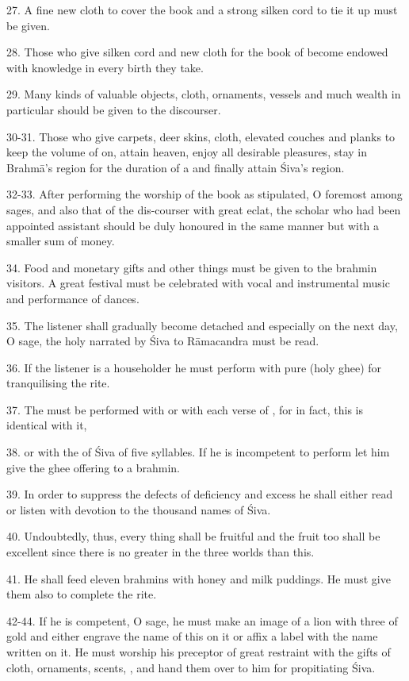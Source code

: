 27. A fine new cloth to cover the book and a strong silken cord to tie it up
must be given.

28. Those who give silken cord and new cloth for the book of  become
 endowed with knowledge in every birth they take.

29. Many kinds of valuable objects, cloth, ornaments, vessels and much wealth in
particular should be given to the discourser.

30-31. Those who give carpets, deer skins, cloth, elevated couches and planks to
keep the volume of  on, attain heaven, enjoy all desirable pleasures,
stay in Brahmā’s region for the duration of a  and finally attain
Śiva’s region.

32-33. After performing the worship of the book as stipulated, O foremost among
sages, and also that of the dis-courser with great eclat, the scholar who had
been appointed assistant should be duly honoured in the same manner but with a
smaller sum of money.

34. Food and monetary gifts and other things must be given to the brahmin
visitors. A great festival must be celebrated with vocal and instrumental music
and performance of dances.

35. The listener shall gradually become detached and especially on the next day,
O sage, the holy  narrated by Śiva to Rāmacandra must be read.

36. If the listener is a householder he must perform  with pure
 (holy ghee) for tranquilising the rite.

37. The  must be performed with  or with each verse of
, for in fact, this  is identical with it,

38. or with the  of Śiva of five syllables. If he is incompetent
to perform  let him give the ghee offering to a brahmin.

39. In order to suppress the defects of deficiency and excess he shall either
read or listen with devotion to the thousand names of Śiva.

40. Undoubtedly, thus, every thing shall be fruitful and the fruit too shall be
excellent since there is no greater in the three worlds than this.

41. He shall feed eleven brahmins with honey and milk puddings. He must give
them  also to complete the rite.

42-44. If he is competent, O sage, he must make an image of a lion with three
 of gold and either engrave the name of this  on it or
affix a label with the name written on it. He must worship his preceptor of
great restraint with the gifts of cloth, ornaments, scents, \etc, and hand them
over to him for propitiating Śiva.

